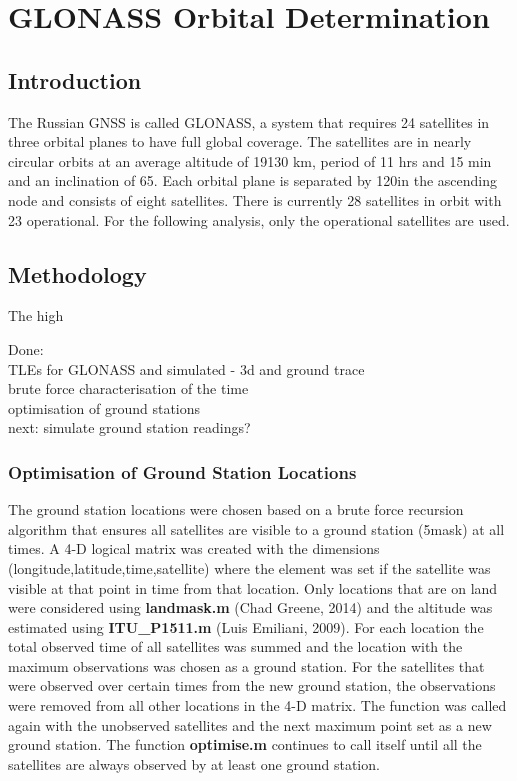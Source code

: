 \documentclass[Space3_Assign2]{subfile}
\begin{document}
\section{GLONASS Orbital Determination}
\subsection{Introduction}
The Russian GNSS is called GLONASS, a system that requires 24 satellites in three orbital planes to have full global coverage. The satellites are in nearly circular orbits at an average altitude of 19130 km, period of 11 hrs and 15 min and an inclination of 65\Deg. Each orbital plane is separated by 120\Deg in the ascending node and consists of eight satellites. There is currently 28 satellites in orbit with 23 operational. For the following analysis, only the operational satellites are used. 
\subsection{Methodology}
The high


Done:\\
TLEs for GLONASS and simulated - 3d and ground trace\\
brute force characterisation of the time \\
optimisation of ground stations \\

next:
simulate ground station readings?\\


\subsubsection{Optimisation of Ground Station Locations}
The ground station locations were chosen based on a brute force recursion algorithm that ensures all satellites are visible to a ground station (5\Deg mask) at all times. A 4-D logical matrix was created with the dimensions (longitude,latitude,time,satellite) where the element was set if the satellite was visible at that point in time from that location. Only locations that are on land were considered using \textbf{landmask.m} (Chad Greene, 2014) and the altitude was estimated using \textbf{ITU\_P1511.m} (Luis Emiliani, 2009). For each location the total observed time of all satellites was summed and the location with the maximum observations was chosen as a ground station. For the satellites that were observed over certain times from the new ground station, the observations were removed from all other locations in the 4-D matrix. The function was called again with the unobserved satellites and the next maximum point set as a new ground station. The function \textbf{optimise.m} continues to call itself until all the satellites are always observed by at least one ground station. 
\end{document}
